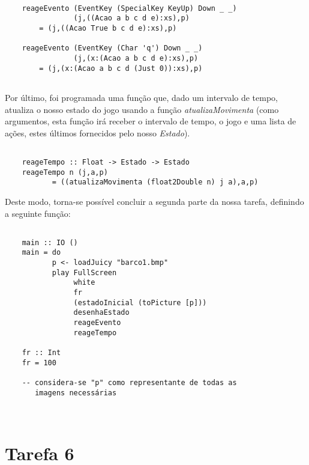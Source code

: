 \documentclass[a4paper]{report} %
\begin{document}
  \begin{verbatim}
      
    reageEvento (EventKey (SpecialKey KeyUp) Down _ _) 
                (j,((Acao a b c d e):xs),p) 
        = (j,((Acao True b c d e):xs),p) 
        
    reageEvento (EventKey (Char 'q') Down _ _) 
                (j,(x:(Acao a b c d e):xs),p) 
        = (j,(x:(Acao a b c d (Just 0)):xs),p)
      
  \end{verbatim}
  
  \newpage
  
  \par \noindent Por último, foi programada uma função que, dado um intervalo de tempo, atualiza o nosso estado do jogo usando a função \textit{atualizaMovimenta} (como argumentos, esta função irá receber o intervalo de tempo, o jogo e uma lista de ações, estes últimos fornecidos pelo nosso \textit{Estado}).
  
  \begin{verbatim}
    
    reageTempo :: Float -> Estado -> Estado 
    reageTempo n (j,a,p) 
           = ((atualizaMovimenta (float2Double n) j a),a,p)

  \end{verbatim}
  
  \par \noindent Deste modo, torna-se possível concluir a segunda parte da nossa tarefa, definindo a seguinte função:
  
  \begin{verbatim}
      
    main :: IO ()
    main = do 
           p <- loadJuicy "barco1.bmp"
           play FullScreen 
                white 
                fr 
                (estadoInicial (toPicture [p])) 
                desenhaEstado 
                reageEvento 
                reageTempo
                
    fr :: Int 
    fr = 100
    
    -- considera-se "p" como representante de todas as
       imagens necessárias 
             
      
  \end{verbatim}
  
  \newpage
  
  \section{Tarefa 6}
  
\end{document}
